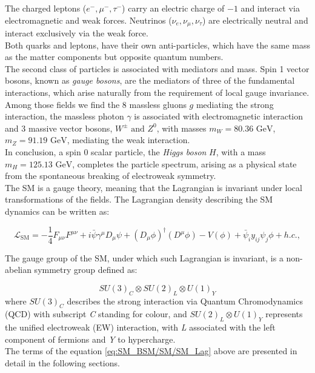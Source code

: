 The charged leptons ($e^-, \mu^-, \tau^-$) carry an electric charge of $-1$ and interact via electromagnetic and weak forces. Neutrinos ($\nu_e, \nu_\mu, \nu_\tau$) are electrically neutral and interact exclusively via the weak force.\\
Both quarks and leptons, have their own anti-particles, which have the same mass as the matter components but opposite quantum numbers.\\
The second class of particles is associated with mediators and mass. Spin 1 vector bosons, known as \textit{gauge bosons}, are the mediators of three of the fundamental interactions, which arise naturally from the requirement of local gauge invariance. Among those fields we find the 8 massless gluons $g$ mediating the strong interaction, the massless photon $\gamma$ is associated with electromagnetic interaction and 3 massive vector bosons, $W^\pm \text{ and } Z^0$, with masses $m_W=80.36\text{ GeV}$, $m_Z=91.19\text{ GeV}$, mediating the weak interaction.\\
In conclusion, a spin 0 scalar particle, the \textit{Higgs boson} $H$, with a mass $m_H = 125.13\text{ GeV}$, completes the particle spectrum, arising as a physical state from the spontaneous breaking of electroweak symmetry.\\

\noindent The SM is a gauge theory, meaning that the Lagrangian is invariant under local transformations of the fields. The Lagrangian density describing the SM dynamics can be written as:

\begin{equation}\label{eq:SM_BSM/SM/SM_Lag}
\mathcal{L}_{\text{SM}} = -\frac{1}{4} F_{\mu\nu} F^{\mu\nu} + i\bar{\psi} \gamma^\mu D_\mu \psi + (D_\mu \phi)^\dagger (D^\mu \phi) - V(\phi) + \bar{\psi}_i y_{ij} \psi_j \phi + h.c.,
\end{equation}

\noindent The gauge group of the SM, under which such Lagrangian is invariant, is a non-abelian symmetry group defined as:

\begin{equation}
    SU(3)_C \otimes SU(2)_L \otimes U(1)_Y
\end{equation}
\noindent where $SU(3)_C$ describes the strong interaction via Quantum Chromodynamics (QCD) with subscript \textit{C} standing for colour, and $SU(2)_L \otimes U(1)_Y$ represents the unified electroweak (EW) interaction, with \textit{L} associated with the left component of fermions and \textit{Y} to hypercharge.\\
The terms of the equation \ref{eq:SM_BSM/SM/SM_Lag} above are presented in detail in the following sections.

